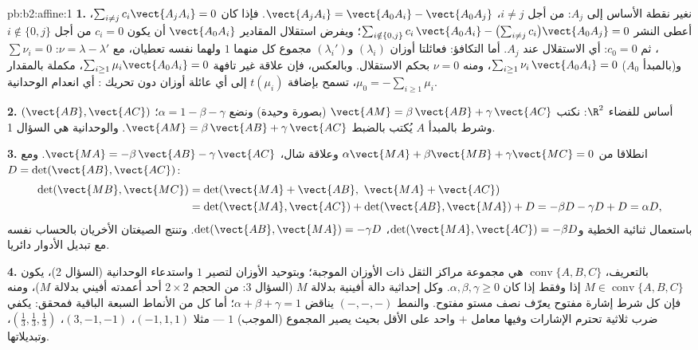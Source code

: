 \begin{solution}{pb:b2:affine:1}
\textbf{1.} نغير نقطة الأساس إلى $A_j$: من أجل $i \neq j$، $\vect{A_jA_i} =
\vect{A_0A_i} - \vect{A_0A_j}$.
فإذا كان $\sum_{i \neq j}
c_i\vect{A_jA_i} = 0$، أعطى النشر $\sum_{i \notin \{0,
j\}} c_i\,\vect{A_0A_i} - \bigl(\sum_{i\neq j}
c_i\bigr)\vect{A_0A_j} = 0$؛ ويفرض استقلال المقادير $\vect{A_0A_i}$
أن يكون $c_i = 0$ من أجل $i \notin \{0, j\}$، ثم $c_0 = 0$: أي الاستقلال عند $A_j$.
أما التكافؤ: فعائلتا أوزان $(\lambda_i)$ و$(\lambda_i')$ مجموع كل منهما $1$
ولهما  نفسه تعطيان، مع $\nu = \lambda -
\lambda'$: $\sum\nu_i = 0$ و(بالمبدأ $A_0$)
$\sum_{i \geq
1}\nu_i\,\vect{A_0A_i} = 0$، ومنه $\nu = 0$ بحكم الاستقلال.
وبالعكس، فإن علاقة غير تافهة $\sum_{i\geq1}\mu_i
\vect{A_0A_i} = 0$، مكملة بالمقدار $\mu_0 = -\sum_{i\geq1}
\mu_i$، تسمح
بإضافة $t(\mu_i)$ إلى أي عائلة أوزان دون تحريك : أي انعدام
الوحدانية.

\textbf{2.} $(\vect{AB}, \vect{AC})$ أساس للفضاء $\R^2$:
نكتب $\vect{AM} = \beta\,\vect{AB} + \gamma\,\vect{AC}$ (بصورة وحيدة) ونضع $\alpha = 1 - \beta - \gamma$؛ وشرط  بالمبدأ
$A$ يُكتب بالضبط $\vect{AM} =
\beta\,\vect{AB} + \gamma\,\vect{AC}$. والوحدانية هي السؤال 1.

\textbf{3.} انطلاقا من $\alpha\vect{MA} + \beta\vect{MB} +
\gamma\vect{MC} = 0$ وعلاقة شال، $\vect{MA} =
-\beta\,\vect{AB} - \gamma\,\vect{AC}$. ومع $D =
\det(\vect{AB}, \vect{AC})$:
\begin{align*}
\det(\vect{MB}, \vect{MC})
&= \det(\vect{MA} + \vect{AB},\ \vect{MA} + \vect{AC})\\
&= \det(\vect{MA}, \vect{AC}) + \det(\vect{AB}, \vect{MA}) +
D = -\beta D - \gamma D + D = \alpha D,
\end{align*}
باستعمال ثنائية الخطية و$\det(\vect{MA}, \vect{AC}) = -\beta D$، $\det(\vect{AB}, \vect{MA}) = -\gamma D$. وتنتج الصيغتان الأخريان
بالحساب نفسه مع تبديل الأدوار دائريا.

\textbf{4.} بالتعريف، $\operatorname{conv}\{A, B, C\}$ هي مجموعة مراكز الثقل ذات الأوزان
الموجبة؛ وبتوحيد الأوزان لتصير $1$ واستدعاء الوحدانية (السؤال 2)،
يكون $M \in \operatorname{conv}\{A,B,C\}$ إذا وفقط إذا كان $\alpha, \beta,
\gamma \geq 0$. وكل إحداثية دالة أفينية بدلالة
$M$ (السؤال 3:  من الحجم $2\times2$ أحد أعمدته أفيني بدلالة
$M$)، ومنه فإن كل شرط إشارة مفتوح يعرّف نصف مستو مفتوح. والنمط
$(-,-,-)$ يناقض $\alpha + \beta
+ \gamma = 1$؛ أما كل من الأنماط السبعة الباقية فمحقق: يكفي
ضرب ثلاثية تحترم الإشارات وفيها معامل $+$ واحد على الأقل بحيث
يصير المجموع (الموجب) $1$ --- مثلا $(-1, 1, 1)$، $(3, -1, -1)$، $(\frac13, \frac13, \frac13)$،
وتبديلاتها.


\end{solution}
